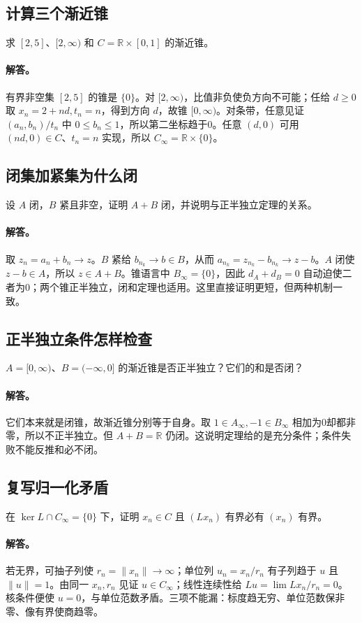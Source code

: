 \documentclass[11pt,a4paper]{article}
\newcommand{\R}{\mathbb{R}}\newcommand{\N}{\mathbb{N}}
\theoremstyle{definition}\newtheorem{definition}{定义}\newtheorem{example}{例}
\begin{document}
\subsection{计算三个渐近锥}
求 $[2,5]$、$[2,\infty)$ 和 $C=\R\times[0,1]$ 的渐近锥。
\paragraph{解答。}有界非空集 $[2,5]$ 的锥是 $\{0\}$。对 $[2,\infty)$，比值非负使负方向不可能；任给 $d\ge0$ 取 $x_n=2+nd,t_n=n$，得到方向 $d$，故锥 $[0,\infty)$。对条带，任意见证 $(a_n,b_n)/t_n$ 中 $0\le b_n\le1$，所以第二坐标趋于0。任意 $(d,0)$ 可用 $(nd,0)\in C$、$t_n=n$ 实现，所以 $C_\infty=\R\times\{0\}$。
\subsection{闭集加紧集为什么闭}
设 $A$ 闭，$B$ 紧且非空，证明 $A+B$ 闭，并说明与正半独立定理的关系。
\paragraph{解答。}取 $z_n=a_n+b_n\to z$。$B$ 紧给 $b_{n_k}\to b\in B$，从而 $a_{n_k}=z_{n_k}-b_{n_k}\to z-b$。$A$ 闭使 $z-b\in A$，所以 $z\in A+B$。锥语言中 $B_\infty=\{0\}$，因此 $d_A+d_B=0$ 自动迫使二者为0；两个锥正半独立，闭和定理也适用。这里直接证明更短，但两种机制一致。
\subsection{正半独立条件怎样检查}
$A=[0,\infty)$、$B=(-\infty,0]$ 的渐近锥是否正半独立？它们的和是否闭？
\paragraph{解答。}它们本来就是闭锥，故渐近锥分别等于自身。取 $1\in A_\infty,-1\in B_\infty$ 相加为0却都非零，所以不正半独立。但 $A+B=\R$ 仍闭。这说明定理给的是充分条件；条件失败不能反推和必不闭。
\subsection{复写归一化矛盾}
在 $\ker L\cap C_\infty=\{0\}$ 下，证明 $x_n\in C$ 且 $(Lx_n)$ 有界必有 $(x_n)$ 有界。
\paragraph{解答。}若无界，可抽子列使 $r_n=\|x_n\|\to\infty$；单位列 $u_n=x_n/r_n$ 有子列趋于 $u$ 且 $\|u\|=1$。由同一 $x_n,r_n$ 见证 $u\in C_\infty$；线性连续性给 $Lu=\lim Lx_n/r_n=0$。核条件便使 $u=0$，与单位范数矛盾。三项不能漏：标度趋无穷、单位范数保非零、像有界使商趋零。
\end{document}

